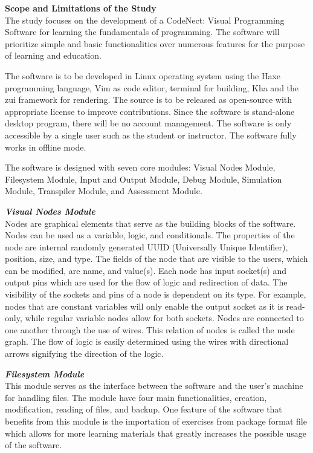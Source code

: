 \flushleft
\textbf{Scope and Limitations of the Study}\\
\justifying
\parx
The study focuses on the development of a CodeNect: Visual Programming Software
for learning the fundamentals of programming. The software will prioritize
simple and basic functionalities over numerous features for the purpose of
learning and education.

The software is to be developed in Linux operating system using the Haxe programming
language, Vim as code editor, terminal for building, Kha and the zui framework for
rendering.
The source is to be released as open-source with appropriate license to improve
contributions. Since the software is stand-alone desktop program, there will be no
account management. The software is only accessible by a single user such as the
student or instructor.
The software fully works in offline mode.

The software is designed with seven core modules: Visual Nodes Module,
Filesystem Module, Input and Output Module, Debug Module, Simulation Module,
Transpiler Module, and Assessment Module.

\flushleft
\textbf{\textit{Visual Nodes Module}}\\
\justifying
\parx
Nodes are graphical elements that serve as the building blocks of the software.
Nodes can be used as a variable, logic, and conditionals. The properties of the node
are internal randomly generated UUID (Universally Unique Identifier), position,
size, and type. The fields of the node that are visible to the users, which can be
modified, are name, and value(s). Each node has input socket(s) and output pins
which are used for the flow of logic and redirection of data. The visibility of the
sockets and pins of a node is dependent on its type.  For example, nodes that are
constant variables will only enable the output socket as it is read-only, while
regular variable nodes allow for both sockets.  Nodes are connected to one another
through the use of wires. This relation of nodes is called the node graph. The flow
of logic is easily determined using the wires with directional arrows signifying the
direction of the logic.

\flushleft
\textbf{\textit{Filesystem Module}}\\
\justifying
\parx
This module serves as the interface between the software and the user's machine for
handling files. The module have four main functionalities, creation, modification,
reading of files, and backup. One feature of the software that benefits from this
module is the importation of exercises from package format file which allows for
more learning materials that greatly increases the possible usage of the software.

